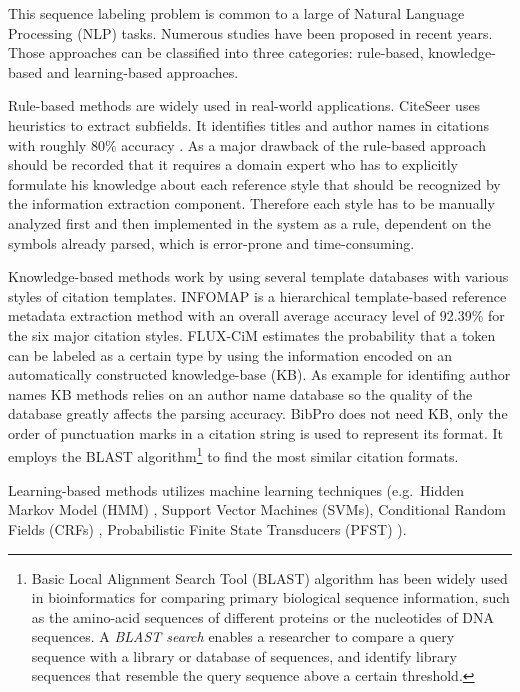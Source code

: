 This sequence labeling problem is common to a large of Natural Language Processing (NLP) tasks. Numerous studies have been proposed in recent years. Those approaches can be classified into three categories: rule-based, knowledge-based and learning-based approaches.

Rule-based methods are widely used in real-world applications. CiteSeer \cite{lawrence1999dla} uses heuristics to extract subfields. It identifies titles and author names in citations with roughly 80\% accuracy \cite{giles1998cac}. As a major drawback of the rule-based approach should be recorded that it requires a domain expert who has to explicitly formulate his knowledge about each reference style that should be recognized by the information extraction component. Therefore each style has to be manually analyzed first and then implemented in the system as a rule, dependent on the symbols already parsed, which is error-prone and time-consuming.

Knowledge-based methods work by using several template databases with various styles of citation templates. INFOMAP \cite{day2007} is a hierarchical template-based reference metadata extraction method with an overall average accuracy level of 92.39\% for the six major citation styles. FLUX-CiM \cite{cortez2007} estimates the probability that a token can be labeled as a certain type by using the information encoded on an automatically constructed knowledge-base (KB). As example for identifing author names KB methods relies on an author name database so the quality of the database greatly affects the parsing accuracy. BibPro \cite{chen2008bcp} does not need KB, only the order of punctuation marks in a citation string is used to represent its format. It employs the BLAST algorithm\footnote{Basic Local Alignment Search Tool (BLAST) algorithm has been widely used in bioinformatics for comparing primary biological sequence information, such as the amino-acid sequences of different proteins or the nucleotides of DNA sequences. A \emph{BLAST search} enables a researcher to compare a query sequence with a library or database of sequences, and identify library sequences that resemble the query sequence above a certain threshold.} to find the most similar citation formats.

Learning-based methods utilizes machine learning techniques (e.g.\ Hidden Markov Model (HMM) \cite{hetzner2008smc}, Support Vector Machines (SVMs), Conditional Random Fields (CRFs) \cite{peng2004aie, councill:pos}, Probabilistic Finite State Transducers (PFST) \cite{kramer2007}).

